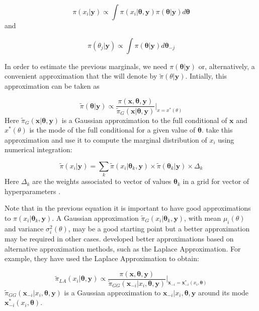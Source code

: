 \documentclass[article]{jss}
\begin{document}
$$
\pi(x_i|\mathbf{y}) \propto \int \pi(x_i|\mathbf{\theta}, \mathbf{y})  \pi(\mathbf{\theta}| \mathbf{y}) d\mathbf{\theta}
$$
\noindent
and

$$
\pi(\theta_j|\mathbf{y}) \propto \int \pi(\mathbf{\theta}| \mathbf{y})  d\mathbf{\theta}_{-j} 
$$

In order to estimate the previous marginals, we need 
$\pi(\mathbf{\theta}|\mathbf{y})$ or, alternatively, a convenient
approximation that the will denote by $\tilde\pi(\theta|\mathbf{y})$.
Intially, this approximation can be taken as

$$
\tilde\pi(\mathbf{\theta}|\mathbf{y})\propto 
\frac{\pi(\mathbf{x},\mathbf{\theta},\mathbf{y})}{\tilde\pi_G(\mathbf{x}|\mathbf{\theta},\mathbf{y})}\bigg|_{x=x^*(\theta)}
$$
\noindent
Here 
$\tilde\pi_G(\mathbf{x}|\mathbf{\theta},\mathbf{y})$ is a Gaussian
approximation to the full conditional of $\mathbf{x}$ and $x^*(\theta)$
is the mode of the full conditional for a given value of $\mathbf{\theta}$.
\citet{isi:000264374200002} take this approximation and use it 
to compute the marginal distribution of $x_i$ using numerical integration:

$$
\tilde\pi(x_i|\mathbf{y})= 
\sum_k \tilde\pi (x_i|\mathbf{\theta}_k, \mathbf{y})\times 
\tilde\pi(\mathbf{\theta}_k|\mathbf{y})\times \Delta_k
$$
\noindent
Here $\Delta_k$ are the weights associated to vector of values
$\mathbf{\theta}_k$ in a grid for vector of hyperparameters .


Note that in the previous equation it is important to have good approximations
to $\pi (x_i|\mathbf{\theta}_k, \mathbf{y})$. A Gaussian approximation
$\tilde\pi_G (x_i|\mathbf{\theta}_k, \mathbf{y})$, with mean $\mu_i(\theta)$
and variance $\sigma^2_i(\theta)$, may be a good starting point but a better
approximation may be required in other cases. \citet{isi:000264374200002}
developed better approximations based on alternative approximation methods,
such as the Laplace Approximation.  For example, they have used the Laplace
Approximation to obtain:

$$
\tilde\pi_{LA}(x_i|\mathbf{\theta}, \mathbf{y}) \propto 
\frac{\pi(\mathbf{x}, \mathbf{\theta}, \mathbf{y})}
{\tilde\pi_{GG}(\mathbf{x}_{-i}|x_i, \mathbf{\theta}, \mathbf{y})}
\bigg|_{\mathbf{x}_{-i}=\mathbf{x}^*_{-i}(x_i, \mathbf{\theta})}
$$
\noindent
$\tilde\pi_{GG}(\mathbf{x}_{-i}|x_i, \mathbf{\theta}, \mathbf{y})$ is a
Gaussian  approximation to $\mathbf{x}_{-i}|x_i, \mathbf{\theta}, \mathbf{y}$
around its mode $\mathbf{x}^*_{-i}(x_i, \mathbf{\theta})$.
\end{document}
